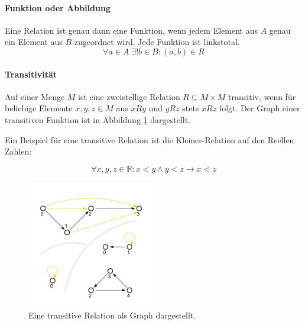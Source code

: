 \documentclass[../main.tex]{subfiles}
\begin{document}
                \paragraph{Funktion oder Abbildung}
                    Eine Relation ist genau dann eine Funktion, wenn jedem Element aus $A$ genau ein Element aus $B$ zugeordnet wird. Jede Funktion ist linkstotal. %
                    \begin{equation}
                        \forall a \in A\; \exists! b \in B\colon \left(a, b\right) \in R
                    \end{equation}
                    
                \paragraph{Transitivität}
                    Auf einer Menge $M$ ist eine zweistellige Relation $R \subseteq M \times M$ transitiv, wenn für beliebige Elemente $x, y, z \in M$ aus $xRy$ und $yRz$ stets $xRz$ folgt. Der Graph einer transitiven Funktion ist in Abbildung \ref{figure:Mathematik:FormaleGrundlagen:Transitivitaet_Graph} dargestellt.
                    
                    Ein Beispiel für eine transitive Relation ist die Kleiner-Relation auf den Reellen Zahlen:
                    
                    \begin{equation}
                        \forall x, y, z \in \mathbb{R}\colon x < y \land y < z \rightarrow x < z
                    \end{equation}
                    
                    \begin{figure}
                         \centering
                         \includegraphics[width=0.5\textwidth]{Abbildungen/Transitivitaet_Graph.png}
                         \caption{Eine transitive Relation als Graph dargestellt.}
                         \label{figure:Mathematik:FormaleGrundlagen:Transitivitaet_Graph}
                    \end{figure}
                    
\end{document}
